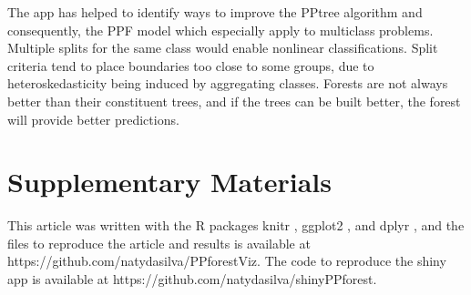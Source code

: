 \documentclass[smallextended,natbib]{svjour3}\usepackage[]{graphicx}\usepackage[]{xcolor}
\begin{document}
The app has helped to identify ways to improve the PPtree algorithm and consequently, the PPF model which especially apply to multiclass problems. Multiple splits for the same class would enable nonlinear classifications. Split criteria tend to place boundaries too close to some groups, due to heteroskedasticity being induced by aggregating classes. Forests are not always better than their constituent trees, and if the trees can be built better, the forest will provide better predictions.

\section{Supplementary Materials}
This article was written with the R packages knitr \citep{xie:2015}, ggplot2 \citep{hadley:2009}, and dplyr \citep{dplyr}, and the files to reproduce the article and results is available at https://github.com/natydasilva/PPforestViz. The code to reproduce the shiny app is available at https://github.com/natydasilva/shinyPPforest.




\end{document}
